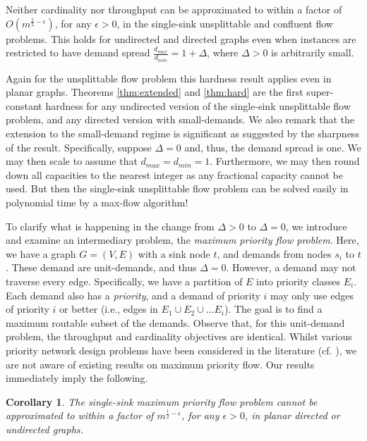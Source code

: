 \documentclass[12pt]{article}
\newtheorem{cor}[thm]{Corollary}
\begin{document}
\begin{thm}
\label{thm:hard} Neither cardinality nor throughput can be approximated to
within a factor of $O(m^{\frac12-\epsilon})$, for any
$\epsilon > 0$, in the single-sink unsplittable and confluent flow problems.
This holds for  undirected and directed graphs even
when instances are restricted to have demand spread
$\frac{d_{max}}{d_{min}}=1 + \Delta$, where $\Delta  > 0$ is arbitrarily small.
\end{thm}
Again for the unsplittable flow problem this hardness result applies even in planar graphs.
Theorems \ref{thm:extended} and \ref{thm:hard} are the first super-constant hardness for any undirected
version of the single-sink unsplittable flow problem, and any directed version with small-demands.
We also remark that the extension to the small-demand regime is significant as suggested by the sharpness of the result.
Specifically, suppose $\Delta=0$ and, thus, the demand spread is one. We may then scale to assume that $d_{max}=d_{min}=1$.
Furthermore, we may then round down all capacities to the nearest integer as any fractional capacity cannot be used.
But then the single-sink unsplittable flow problem can be solved easily in polynomial time by a max-flow algorithm!

To clarify what is happening in the change from $\Delta>0$ to $\Delta=0$, we introduce
and examine an intermediary problem, the {\em maximum priority flow problem}.
Here, we have a graph $G=(V,E)$ with a sink node $t$, and demands from nodes $s_i$ to $t$.
These demand are unit-demands, and thus $\Delta=0$. However, a demand may not traverse every edge.
Specifically, we have a partition of $E$ into priority classes $E_i$. Each demand also has a {\em priority}, and
a demand of priority $i$ may only use edges of priority $i$ or better (i.e., edges in $E_1 \cup E_2 \cup \ldots E_i$).
The goal is to find a maximum routable subset of the demands. Observe that, for this unit-demand problem, the
throughput and cardinality objectives are identical.
Whilst various priority network design problems have been considered in the literature (cf. \cite{charikar2004resource,chuzhoy2008approximability}),
we are not aware of existing results on maximum priority flow. Our results immediately imply the following.
\begin{cor}
\label{cor:priority}
The single-sink maximum priority flow problem
cannot be approximated to within a factor of $m^{\frac12-\epsilon}$, for any $\epsilon > 0$, in planar
directed or undirected graphs.
\end{cor}
\end{document}
